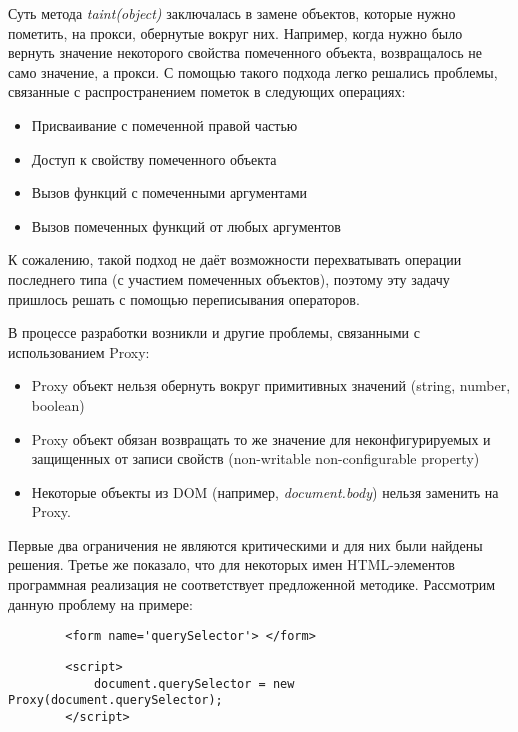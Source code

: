 	Суть метода \textit{taint(object)} заключалась в замене объектов, которые нужно пометить, на прокси, обернутые вокруг них. Например, когда нужно было вернуть значение некоторого свойства помеченного объекта, возвращалось не само значение, а прокси. С помощью такого подхода легко решались проблемы, связанные с распространением пометок в следующих операциях:
	

	\begin{itemize}
		\item Присваивание с помеченной правой частью
		\item Доступ к свойству помеченного объекта
		\item Вызов функций с помеченными аргументами
		\item Вызов помеченных функций от любых аргументов
	\end{itemize}


	К сожалению, такой подход не даёт возможности перехватывать операции последнего типа (с участием помеченных объектов), поэтому эту задачу пришлось решать с помощью переписывания операторов.


	В процессе разработки возникли и другие проблемы, связанными с использованием Proxy:


	\begin{itemize}
		\item Proxy объект нельзя обернуть вокруг примитивных значений (string, number, boolean)
		\item Proxy объект обязан возвращать то же значение для неконфигурируемых и защищенных от записи свойств (non-writable non-configurable property)
		\item Некоторые объекты из DOM (например, \textit{document.body}) нельзя заменить на Proxy.
	\end{itemize}


	Первые два ограничения не являются критическими и для них были найдены решения. Третье же показало, что для некоторых имен HTML-элементов программная реализация не соответствует предложенной методике. Рассмотрим данную проблему на примере:

	\begin{lstlisting}
		<form name='querySelector'> </form>
	\end{lstlisting}

	\begin{lstlisting}
		<script>
			document.querySelector = new Proxy(document.querySelector);
		</script>
	\end{lstlisting}

